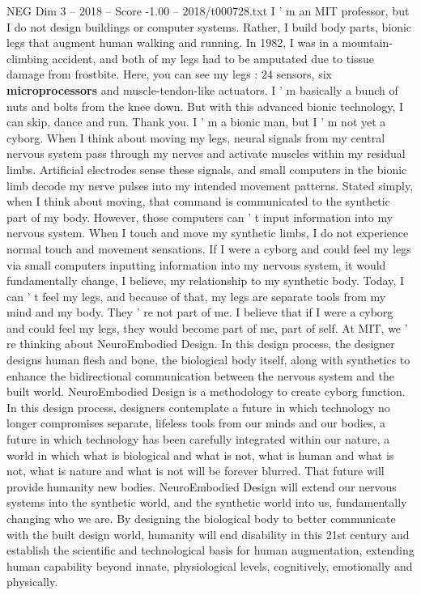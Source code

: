 \begin{textsample}{NEG Dim 3 – 2018 – Score -1.00 – 2018/t000728.txt}  \label{ex:f3_neg_065}
I ' m an MIT professor, but I do not design buildings or computer systems.
Rather, I build body parts, bionic legs that augment human walking and running.
In 1982, I was in a mountain-climbing accident, and both of my legs had to be amputated due to tissue damage from frostbite.
Here, you can see my legs : 24 sensors, six \textbf{microprocessors} and muscle-tendon-like actuators.
I ' m basically a bunch of nuts and bolts from the knee down.
But with this advanced bionic technology, I can skip, dance and run.
Thank you.
I ' m a bionic man, but I ' m not yet a cyborg.
When I think about moving my legs, neural signals from my central nervous system pass through my nerves and activate muscles within my residual limbs.
Artificial electrodes sense these signals, and small computers in the bionic limb decode my nerve pulses into my intended movement patterns.
Stated simply, when I think about moving, that command is communicated to the synthetic part of my body.
However, those computers can ' t input information into my nervous system.
When I touch and move my synthetic limbs, I do not experience normal touch and movement sensations.
If I were a cyborg and could feel my legs via small computers inputting information into my nervous system, it would fundamentally change, I believe, my relationship to my synthetic body.
Today, I can ' t feel my legs, and because of that, my legs are separate tools from my mind and my body.
They ' re not part of me.
I believe that if I were a cyborg and could feel my legs, they would become part of me, part of self.
At MIT, we ' re thinking about NeuroEmbodied Design.
In this design process, the designer designs human flesh and bone, the biological body itself, along with synthetics to enhance the bidirectional communication between the nervous system and the built world.
NeuroEmbodied Design is a methodology to create cyborg function.
In this design process, designers contemplate a future in which technology no longer compromises separate, lifeless tools from our minds and our bodies, a future in which technology has been carefully integrated within our nature, a world in which what is biological and what is not, what is human and what is not, what is nature and what is not will be forever blurred.
That future will provide humanity new bodies.
NeuroEmbodied Design will extend our nervous systems into the synthetic world, and the synthetic world into us, fundamentally changing who we are.
By designing the biological body to better communicate with the built design world, humanity will end disability in this 21st century and establish the scientific and technological basis for human augmentation, extending human capability beyond innate, physiological levels, cognitively, emotionally and physically.

\end{textsample}
